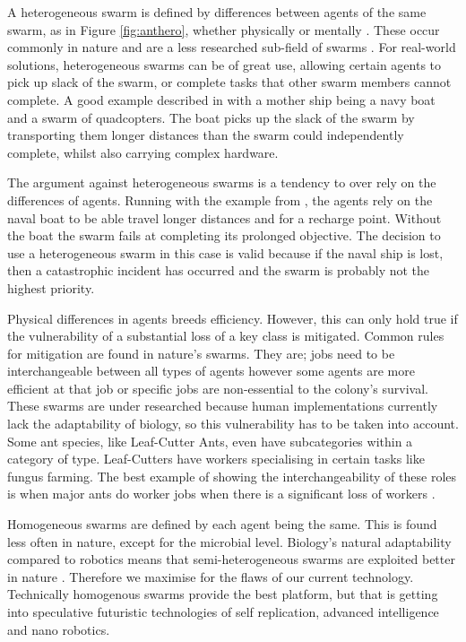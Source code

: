 \documentclass{UoYCSproject}
\begin{document}
A heterogeneous swarm is defined by differences between agents of the same swarm, as in Figure \ref{fig:anthero}, whether physically or mentally \cite{Swarm robotics reviewed, Swarm intellegiegence}.
These occur commonly in nature and are a less researched sub-field of swarms \cite{Swarm intellegiegence}.
For real-world solutions, heterogeneous swarms can be of great use, allowing certain agents to pick up slack of the swarm, or complete tasks that other swarm members cannot complete.
A good example described in \cite{Swarm robotics reviewed} with a mother ship being a navy boat and a swarm of quadcopters.
The boat picks up the slack of the swarm by transporting them longer distances than the swarm could independently complete, whilst also carrying complex hardware.

The argument against heterogeneous swarms is a tendency to over rely on the differences of agents.
Running with the example from \cite{Swarm robotics reviewed}, the agents rely on the naval boat to be able travel longer distances and for a recharge point.
Without the boat the swarm fails at completing its prolonged objective.
The decision to use a heterogeneous swarm in this case is valid because if the naval ship is lost, then a catastrophic incident has occurred and the swarm is probably not the highest priority.

Physical differences in agents breeds efficiency.
However, this can only hold true if the vulnerability of a substantial loss of a key class is mitigated.
Common rules for mitigation are found in nature's swarms.
They are; jobs need to be interchangeable between all types of agents however some agents are more efficient at that job \cite{Ant communication} or specific jobs are non-essential to the colony's survival.
These swarms are under researched because human implementations currently lack the adaptability of biology, so this vulnerability has to be taken into account.
Some ant species, like Leaf-Cutter Ants, even have subcategories within a category of type.
Leaf-Cutters have workers specialising in certain tasks like fungus farming.
The best example of showing the interchangeability of these roles is when major ants do worker jobs when there is a significant loss of workers \cite{Swarm intellegiegence}.

Homogeneous swarms are defined by each agent being the same.
This is found less often in nature, except for the microbial level.
Biology's natural adaptability compared to robotics means that semi-heterogeneous swarms are exploited better in nature \cite{Swarm robotics reviewed, Swarm intellegiegence}.
Therefore we maximise for the flaws of our current technology.
Technically homogenous swarms provide the best platform, but that is getting into speculative futuristic technologies of self replication, advanced intelligence and nano robotics.
\end{document}
